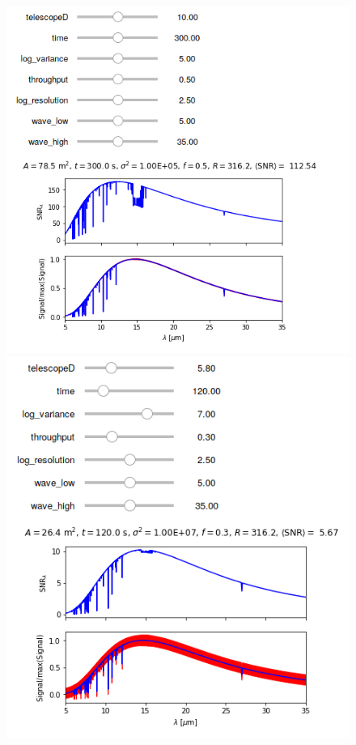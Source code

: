 \documentclass{knac}
\begin{document}
\begin{figure}
    \centering
        \begin{minipage}{.33\textwidth}
        \centering
        \includegraphics[width=1.0\linewidth]{widget_1.png}
    \end{minipage}%
    \begin{minipage}{0.33\textwidth}
        \centering
        \includegraphics[width=1.0\linewidth]{widget_2.png}

\end{minipage}
\end{figure}
\end{document}
